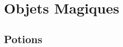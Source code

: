 \documentclass{dd}
\begin{document}









\chapter{Objets Magiques}

\section{Potions} \label{potions}

\end{document}
